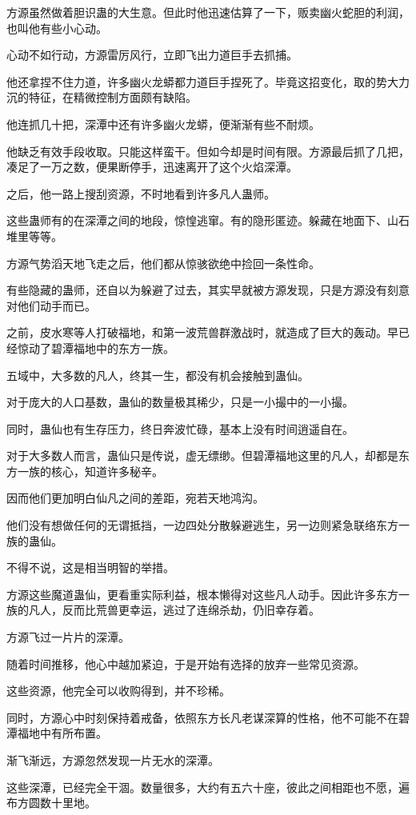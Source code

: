 \begin{this_body}
方源虽然做着胆识蛊的大生意。但此时他迅速估算了一下，贩卖幽火蛇胆的利润，也叫他有些小心动。

心动不如行动，方源雷厉风行，立即飞出力道巨手去抓捕。

他还拿捏不住力道，许多幽火龙蟒都力道巨手捏死了。毕竟这招变化，取的势大力沉的特征，在精微控制方面颇有缺陷。

他连抓几十把，深潭中还有许多幽火龙蟒，便渐渐有些不耐烦。

他缺乏有效手段收取。只能这样蛮干。但如今却是时间有限。方源最后抓了几把，凑足了一万之数，便果断停手，迅速离开了这个火焰深潭。

之后，他一路上搜刮资源，不时地看到许多凡人蛊师。

这些蛊师有的在深潭之间的地段，惊惶逃窜。有的隐形匿迹。躲藏在地面下、山石堆里等等。

方源气势滔天地飞走之后，他们都从惊骇欲绝中捡回一条性命。

有些隐藏的蛊师，还自以为躲避了过去，其实早就被方源发现，只是方源没有刻意对他们动手而已。

之前，皮水寒等人打破福地，和第一波荒兽群激战时，就造成了巨大的轰动。早已经惊动了碧潭福地中的东方一族。

五域中，大多数的凡人，终其一生，都没有机会接触到蛊仙。

对于庞大的人口基数，蛊仙的数量极其稀少，只是一小撮中的一小撮。

同时，蛊仙也有生存压力，终日奔波忙碌，基本上没有时间逍遥自在。

对于大多数人而言，蛊仙只是传说，虚无缥缈。但碧潭福地这里的凡人，却都是东方一族的核心，知道许多秘辛。

因而他们更加明白仙凡之间的差距，宛若天地鸿沟。

他们没有想做任何的无谓抵挡，一边四处分散躲避逃生，另一边则紧急联络东方一族的蛊仙。

不得不说，这是相当明智的举措。

方源这些魔道蛊仙，更看重实际利益，根本懒得对这些凡人动手。因此许多东方一族的凡人，反而比荒兽更幸运，逃过了连绵杀劫，仍旧幸存着。

方源飞过一片片的深潭。

随着时间推移，他心中越加紧迫，于是开始有选择的放弃一些常见资源。

这些资源，他完全可以收购得到，并不珍稀。

同时，方源心中时刻保持着戒备，依照东方长凡老谋深算的性格，他不可能不在碧潭福地中有所布置。

渐飞渐远，方源忽然发现一片无水的深潭。

这些深潭，已经完全干涸。数量很多，大约有五六十座，彼此之间相距也不愿，遍布方圆数十里地。


\end{this_body}
